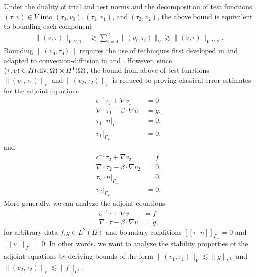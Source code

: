 \documentclass[11pt,onecolumn]{scrartcl}
\newcommand{\LRs}[1]{\left[ #1 \right]}
\newcommand{\jump}[1] {\ensuremath{\LRs{\![#1]\!}}}
\newcommand{\grad}{\nabla}
\renewcommand{\div}{\grad \cdot}
\begin{document}
Under the duality of trial and test norms and the decomposition of test functions $\left(\tau,v\right) \in V$ into $\left(\tau_0,v_0\right), \left(\tau_1,v_1\right)$, and $\left(\tau_2,v_2\right)$, the above bound is equivalent to bounding each component 
\begin{align*}
\|\left(v,\tau\right)\|_{V,U,1} &\gtrsim \sum_{i=0}^2\|\left(v_{i},\tau_{i}\right)\|_V \gtrsim \|\left(v,\tau\right)\|_{V,U,2}.
\end{align*}
Bounding $\|\left(v_0,\tau_0\right)\|$ requires the use of techniques first developed in \cite{analysisDPG} and adapted to convection-diffusion in \cite{analysisDPG} and \cite{DPGrobustness}. However, since $\left(\tau,v\right) \in H({\rm div}, \Omega)\times H^1(\Omega)$, the bound from above of test functions $\|\left(v_{1},\tau_{1}\right)\|_V$ and $\|\left(v_{2},\tau_{2}\right)\|_V$ is reduced to proving classical error estimates for the adjoint equations
\begin{align*}
\epsilon^{-1}\tau_1 + \grad {v_1} &= 0 \\
\div {\tau_1} - \beta\cdot \grad {v_1} &=  g, \\
\left.\tau_1\cdot n\right|_{\Gamma_-} &= 0, \\
\left.v_1\right|_{\Gamma_+} &= 0.
\end{align*} 
and 
\begin{align*}
\epsilon^{-1}\tau_2 + \grad {v_2} &= f \\
\div {\tau_2} - \beta\cdot \grad {v_2} &= 0, \\
\left.\tau_2\cdot n\right|_{\Gamma_-} &= 0, \\
\left.v_2\right|_{\Gamma_+} &= 0.
\end{align*} 
More generally, we can analyze the adjoint equations
\begin{align}
\epsilon^{-1}\tau + \grad {v} &= f \label{adjoint1}\\
\div {\tau} - \beta\cdot \grad {v} &= g, \label{adjoint2}
\end{align}
for arbitrary data $f, g\in L^2({\Omega})$ and boundary conditions $\jump{\tau\cdot n}_{\Gamma_-} = 0$ and $\jump{v}_{\Gamma_+} = 0$.  In other words, we want to analyze the stability properties of the adjoint equations by deriving bounds of the form $\|\left(v_1,\tau_1\right)\|_V\lesssim \|g\|_{L^2}$ and $\|\left(v_2,\tau_2\right)\|_V \lesssim \|f\|_{L^2}$.  
\end{document}
